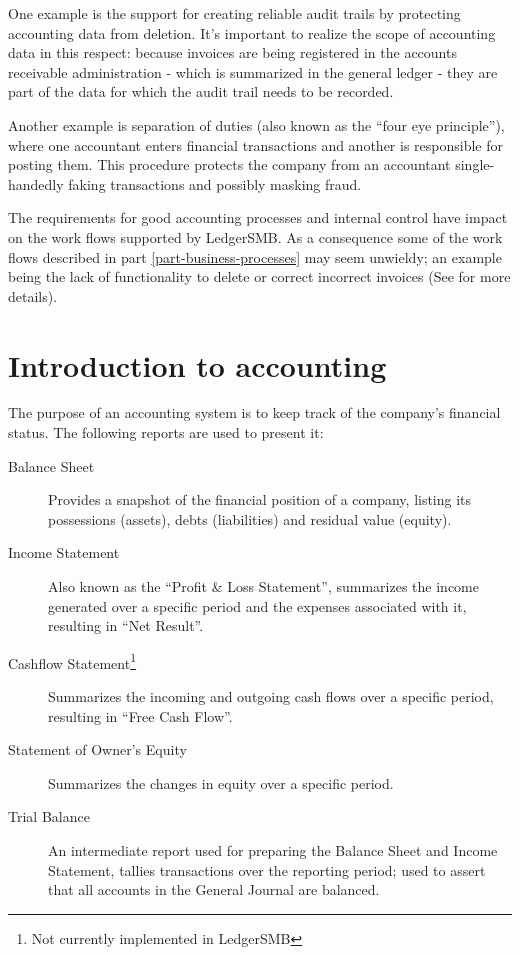 One example is the support for creating reliable audit trails
by protecting accounting data from deletion. It's important to realize the scope
of accounting data in this respect: because invoices are being registered in the
accounts receivable administration - which is summarized in the general ledger -
they are part of the data for which the audit trail needs to be recorded.

Another example is separation of duties (also known as the ``four eye principle''),
where one accountant enters financial transactions and another is responsible for
posting them. This procedure protects the company from an accountant single-handedly
faking transactions and possibly masking fraud.

The requirements for good accounting processes and internal control have impact
on the work flows supported by LedgerSMB. As a consequence some of the work flows
described in part \ref{part-business-processes} may seem unwieldy; an example being the
lack of functionality to delete or correct incorrect invoices (See  for more details).



\chapter{Introduction to accounting}
\label{cha-accounting-introduction}

The purpose of an accounting system is to keep track of the company's financial status.  The following reports are used to
present it:

\begin{description}
	\item[Balance Sheet] Provides a snapshot of the financial position of a company, listing its possessions (assets), debts (liabilities) and residual value (equity).
	\item[Income Statement] Also known as the ``Profit \& Loss Statement'', summarizes the income generated over a specific period and the expenses associated with it, resulting in ``Net Result''.
	\item[Cashflow Statement\footnote{\label{cha-accounting-footnote-not-implemented}Not currently implemented in LedgerSMB}] Summarizes the incoming and outgoing cash flows over a specific period, resulting in ``Free Cash Flow''.
	\item[Statement of Owner's Equity] Summarizes the changes in equity over a specific period.
	\item[Trial Balance] An intermediate report used for preparing the Balance Sheet and Income Statement, tallies transactions over the reporting period; used to assert that all accounts in the General Journal are balanced.
\end{description}


